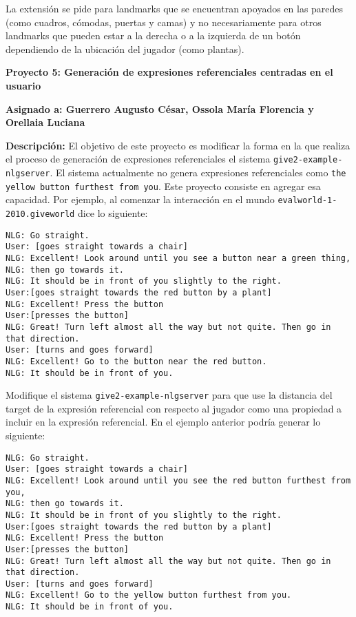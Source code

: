 \documentclass{article}
\begin{document}
La extensi\'on se pide para landmarks que se encuentran apoyados en las paredes (como cuadros, c\'omodas, puertas y camas) y no necesariamente para otros landmarks que pueden estar a la derecha o a la izquierda de un bot\'on dependiendo de la ubicaci\'on del jugador (como plantas).  

\bigskip
\noindent
\textbf{Proyecto 5: Generaci\'on de expresiones referenciales centradas en el usuario} 

\textbf{Asignado a: Guerrero Augusto C\'esar, Ossola Mar\'ia Florencia y Orellaia Luciana} 

\textbf{Descripci\'on:}
El objetivo de este proyecto es modificar la forma en la que realiza el proceso de generaci\'on de expresiones referenciales el sistema \texttt{give2-example-nlgserver}. El sistema actualmente no genera expresiones referenciales como \texttt{the yellow button furthest from you}. Este proyecto consiste en agregar esa capacidad. Por ejemplo, al comenzar la interacci\'on en el mundo \texttt{evalworld-1-2010.giveworld} dice lo siguiente: 

\begin{verbatim}
NLG: Go straight. 
User: [goes straight towards a chair]
NLG: Excellent! Look around until you see a button near a green thing, 
NLG: then go towards it. 
NLG: It should be in front of you slightly to the right. 
User:[goes straight towards the red button by a plant]
NLG: Excellent! Press the button
User:[presses the button]
NLG: Great! Turn left almost all the way but not quite. Then go in that direction. 
User: [turns and goes forward]
NLG: Excellent! Go to the button near the red button. 
NLG: It should be in front of you. 
\end{verbatim}

Modifique el sistema \texttt{give2-example-nlgserver} para que use la distancia del target de la expresi\'on referencial con respecto al jugador como una propiedad a incluir en la expresi\'on referencial. En el ejemplo anterior podr\'ia generar lo siguiente:

\begin{verbatim}
NLG: Go straight. 
User: [goes straight towards a chair]
NLG: Excellent! Look around until you see the red button furthest from you, 
NLG: then go towards it. 
NLG: It should be in front of you slightly to the right. 
User:[goes straight towards the red button by a plant]
NLG: Excellent! Press the button
User:[presses the button]
NLG: Great! Turn left almost all the way but not quite. Then go in that direction. 
User: [turns and goes forward]
NLG: Excellent! Go to the yellow button furthest from you. 
NLG: It should be in front of you. 
\end{verbatim}
\end{document}
